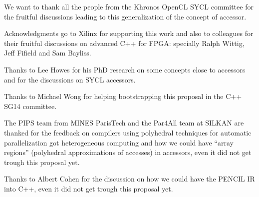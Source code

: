 \documentclass[a4paper]{article}
\begin{document}
We want to thank all the people from the Khronos OpenCL SYCL committee
for the fruitful discussions leading to this generalization of the
concept of accessor.

Acknowledgments go to Xilinx for supporting this work and also to
colleagues for their fruitful discussions on advanced C++ for FPGA:
specially Ralph Wittig, Jeff Fifield and Sam Bayliss.

Thanks to Lee Howes for his PhD \cite{PhD:Howes2010} research on some
concepts close to accessors and for the discussions on SYCL accessors.

Thanks to Michael Wong for helping bootstrapping this proposal in the
C++ SG14 committee.

The PIPS team from MINES ParisTech and the Par4All team at SILKAN are
thanked for the feedback on compilers using polyhedral techniques for
automatic parallelization got heterogeneous computing and how we could
have ``array regions'' (polyhedral approximations of accesses) in
accessors, even it did not get trough this proposal yet.

Thanks to Albert Cohen for the discussion on how we could have the
PENCIL IR \cite{PENCIL} into C++, even it did not get trough this
proposal yet.




\end{document}

